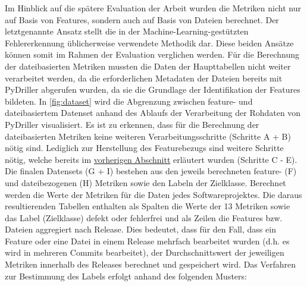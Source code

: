 Im Hinblick auf die spätere Evaluation der Arbeit wurden die Metriken nicht nur auf Basis von Features, sondern auch auf Basis von Dateien berechnet. Der letztgenannte Ansatz stellt die in der Machine-Learning-gestützten Fehlererkennung üblicherweise verwendete Methodik dar. Diese beiden Ansätze können somit im Rahmen der Evaluation verglichen werden. Für die Berechnung der dateibasierten Metriken mussten die Daten der Haupttabellen nicht weiter verarbeitet werden, da die erforderlichen Metadaten der Dateien bereits mit PyDriller abgerufen wurden, da sie die Grundlage der Identifikation der Features bildeten. In \autoref{fig:dataset} wird die Abgrenzung zwischen feature- und dateibasiertem Datenset anhand des Ablaufs der Verarbeitung der Rohdaten von PyDriller visualisiert. Es ist zu erkennen, dass für die Berechnung der dateibasierten Metriken keine weiteren Verarbeitungsschritte (Schritte A + B) nötig sind. Lediglich zur Herstellung des Featurebezugs sind weitere Schritte nötig, welche bereits im \hyperref[construction]{vorherigen Abschnitt} erläutert wurden (Schritte C - E). Die finalen Datensets (G + I) bestehen aus den jeweils berechneten feature- (F) und dateibezogenen (H) Metriken sowie den Labeln der Zielklasse. Berechnet werden die Werte der Metriken für die Daten jedes Softwareprojektes. Die daraus resultierenden Tabellen enthalten als Spalten die Werte der 13 Metriken sowie das Label (Zielklasse) \glqq defekt\grqq{} oder \glqq fehlerfrei\grqq{} und als Zeilen die Features bzw. Dateien aggregiert nach Release. Dies bedeutet, dass für den Fall, dass ein Feature oder eine Datei in einem Release mehrfach bearbeitet wurden (d.h. es wird in mehreren Commits bearbeitet), der Durchschnittswert der jeweiligen Metriken innerhalb des Releases berechnet und gespeichert wird. Das Verfahren zur Bestimmung des Labels erfolgt anhand des folgenden Musters:

\begin{table}[H]
\centering
{}
\end{table}

